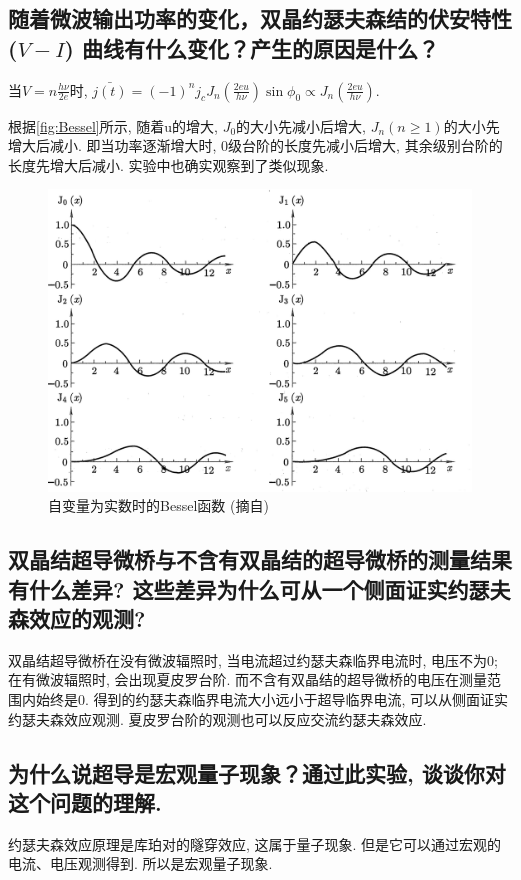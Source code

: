 \documentclass[font=default]{mpltx}
\begin{document}
\subsection{随着微波输出功率的变化，双晶约瑟夫森结的伏安特性 ($V-I$) 曲线有什么变化？产生的原因是什么？}
当$ V = n\frac{h\nu}{2e}$时, $\bar{j(t)} = (-1)^nj_cJ_n(\frac{2eu}{h\nu})\sin{\phi_0}\propto J_n(\frac{2eu}{h\nu})$.
\par
根据\autoref{fig:Bessel}所示, 随着u的增大, $J_0$的大小先减小后增大, $J_n (n\ge 1)$的大小先增大后减小. 即当功率逐渐增大时, 0级台阶的长度先减小后增大, 其余级别台阶的长度先增大后减小.
实验中也确实观察到了类似现象.
\begin{figure}
    \centering
    \includegraphics[width=0.85\linewidth]{fig/7.png}
    \caption{自变量为实数时的Bessel函数 (摘自\cite{shulifangfa})}
    \label{fig:Bessel}
\end{figure}

\subsection{双晶结超导微桥与不含有双晶结的超导微桥的测量结果有什么差异? 这些差异为什么可从一个侧面证实约瑟夫森效应的观测? }
双晶结超导微桥在没有微波辐照时, 当电流超过约瑟夫森临界电流时, 电压不为0; 在有微波辐照时, 会出现夏皮罗台阶. 而不含有双晶结的超导微桥的电压在测量范围内始终是0. 
得到的约瑟夫森临界电流大小远小于超导临界电流, 可以从侧面证实
约瑟夫森效应观测.
夏皮罗台阶的观测也可以反应交流约瑟夫森效应.


\subsection{为什么说超导是宏观量子现象？通过此实验, 谈谈你对这个问题的理解. }
约瑟夫森效应原理是库珀对的隧穿效应, 这属于量子现象. 但是它可以通过宏观的电流、电压观测得到. 所以是宏观量子现象.
\end{document}
